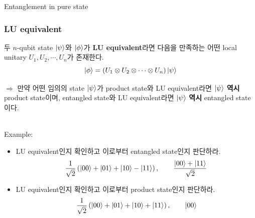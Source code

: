 \documentclass[9pt]{beamer}
\begin{document}
\begin{section}{Entanglement in pure state}
        \begin{frame}
            \frametitle{LU equivalent}
            \begin{definition}[LU equivalent]
                두 $n$-qubit state $\ket \psi$와 $\ket \phi$가 \textbf{LU equivalent}라면 다음을 만족하는 어떤 \alert{local unitary} $U_1, U_2, \cdots, U_n$가 존재한다. 
                \begin{equation*}
                    \ket{\phi} = (U_1 \otimes U_2 \otimes \cdots \otimes U_n) \ket\psi
                \end{equation*}
            \end{definition}
            \vspace{0.2cm}
            $\Rightarrow$ 만약 어떤 임의의 state $\ket{\psi}$가 product state와 LU equivalent라면 $\ket{\psi}$ \textbf{역시} product state이며, entangled state와 LU equivalent라면 $\ket{\psi}$ \textbf{역시} entangled state이다.\\\
            \vspace{0.2cm}
            
            Example: 
            \begin{itemize}
                \item LU equivalent인지 확인하고 이로부터 entangled state인지 판단하라.
                \begin{equation*}
                    \frac{1}{\sqrt 2} \left ( \ket{00} + \ket{01} + \ket{10} - \ket{11} \right), \qquad \frac{\ket{00} + \ket{11}}{ \sqrt 2}
                \end{equation*}
                \item LU equivalent인지 확인하고 이로부터 product state인지 판단하라.
                \begin{equation*}
                    \frac{1}{\sqrt 2} \left ( \ket{00} + \ket{01} + \ket{10} + \ket{11} \right), \qquad \ket{00}
                \end{equation*}
            \end{itemize}
        \end{frame}


\end{section}
\end{document}
